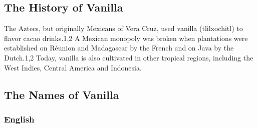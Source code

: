 \subsection{The History of Vanilla}

The Aztecs, but originally Mexicans of Vera Cruz, used vanilla (tlilxochitl) to flavor cacao drinks.1,2 A Mexican monopoly was broken when plantations were established on Réunion and Madagascar by the French and on Java by the Dutch.1,2 Today, vanilla is also cultivated in other tropical regions, including the West Indies, Central America and Indonesia. 












\subsection{The Names of Vanilla}
\label{sec:names_of_vanilla}

\subsubsection{English}




